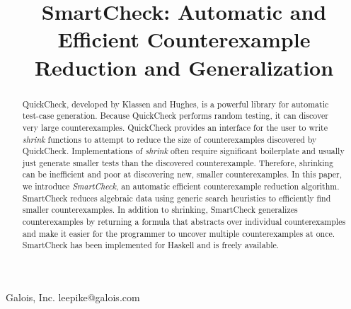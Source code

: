 \documentclass[10pt]{sigplanconf}
\begin{document}


\title{SmartCheck: Automatic and Efficient Counterexample Reduction and Generalization}

           {Galois, Inc.}
           {leepike@galois.com}
\maketitle

\begin{abstract}
QuickCheck, developed by Klassen and Hughes, is a powerful library for automatic
test-case generation.  Because QuickCheck performs random testing, it can
discover very large counterexamples.  QuickCheck provides an interface for the
user to write \emph{shrink} functions to attempt to reduce the size of
counterexamples discovered by QuickCheck.  Implementations of \emph{shrink}
often require significant boilerplate and usually just generate smaller tests
than the discovered counterexample.  Therefore, shrinking can be inefficient and
poor at discovering new, smaller counterexamples.  In this paper, we introduce
\emph{SmartCheck}, an automatic efficient counterexample reduction algorithm.
SmartCheck reduces algebraic data using generic search heuristics to efficiently
find smaller counterexamples.  In addition to shrinking, SmartCheck generalizes
counterexamples by returning a formula that abstracts over individual
counterexamples and make it easier for the programmer to uncover multiple
counterexamples at once.  SmartCheck has been implemented for Haskell and is
freely available.
\end{abstract}




\end{document}

